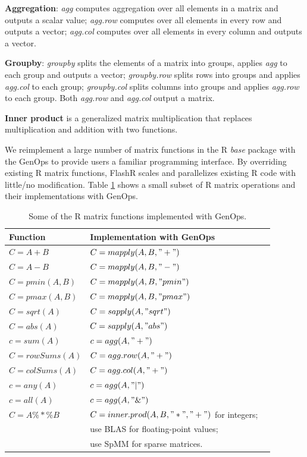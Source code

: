 \noindent \textbf{Aggregation}: \textit{agg} computes aggregation over
all elements in a matrix and outputs a scalar value; \textit{agg.row}
computes over all elements in every row and outputs a vector;
\textit{agg.col} computes over all elements in every column and
outputs a vector.

\noindent \textbf{Groupby}: \textit{groupby} splits the elements of a matrix
into groups, applies \textit{agg} to each group and outputs a vector;
\textit{groupby.row} splits rows into groups and applies \textit{agg.col}
to each group; \textit{groupby.col} splits columns into groups and applies
\textit{agg.row} to each group. Both \textit{agg.row} and \textit{agg.col}
output a matrix.

\noindent \textbf{Inner product} is a generalized matrix multiplication
that replaces multiplication and addition with two functions.

We reimplement a large number of matrix functions in the R \textit{base}
package with the GenOps to provide users a familiar programming interface.
By overriding existing R matrix functions, FlashR scales and parallelizes
existing R code with little/no modification. Table \ref{tbl:Rfuns} shows
a small subset of R matrix operations and their implementations
with GenOps.

\begin{table}
\begin{center}
\caption{Some of the R matrix functions implemented with GenOps.}
\vspace{-10pt}
\footnotesize
\begin{tabular}{|l|l|l|}
\hline
Function & Implementation with GenOps \\
\hline
$C=A+B$ & $C=mapply(A, B, "+")$ \\
$C=A-B$ & $C=mapply(A, B, "-")$ \\
$C=pmin(A,B)$ & $C=mapply(A, B, "pmin")$ \\
$C=pmax(A,B)$ & $C=mapply(A, B, "pmax")$ \\
$C=sqrt(A)$ & $C=sapply(A, "sqrt")$ \\
$C=abs(A)$ & $C=sapply(A, "abs")$ \\
\hline
$c=sum(A)$ & $c=agg(A, "+")$ \\
$C=rowSums(A)$ & $C=agg.row(A, "+")$ \\
$C=colSums(A)$ & $C=agg.col(A, "+")$ \\
$c=any(A)$ & $c=agg(A, "|")$ \\
$c=all(A)$ & $c=agg(A, "\&")$ \\
\hline
$C=A \%*\% B$ & $C=inner.prod(A, B, "*", "+")$ for integers; \\
 & use BLAS for floating-point values; \\
 & use SpMM \cite{SEM_SpMM} for sparse matrices. \\
\hline
\end{tabular}
\normalsize
\label{tbl:Rfuns}
\end{center}
\end{table}

